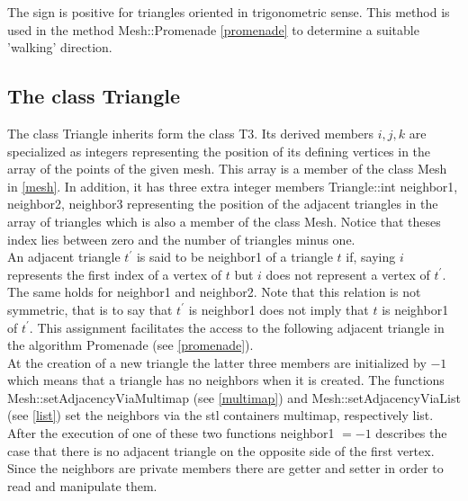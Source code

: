 \documentclass[10pt]{article}
\begin{document}
The sign is positive for triangles oriented in trigonometric sense. This method is used in the method {\ttfamily Mesh::Promenade} \ref{promenade} to determine a suitable 'walking' direction.


\subsection{The class Triangle} \label{triangle}
The class {\ttfamily Triangle} inherits form the class {\ttfamily T3}. Its derived members $ i,j,k $ are specialized as integers representing the position of its defining vertices in the array of the points of the given mesh. This array is a member of the class {\ttfamily Mesh} in \ref{mesh}. In addition, it has three extra integer members {\ttfamily Triangle::int neighbor1, neighbor2, neighbor3} representing the position of the adjacent triangles in the array of triangles which is also a member of the class {\ttfamily Mesh}. Notice that theses index lies between zero and the number of triangles minus one. \\
 An adjacent triangle $ t^{'} $ is said to be  {\ttfamily neighbor1} of a triangle $ t $ if, saying $ i $ represents the first index of a vertex of $t$ but $i$ does not represent a vertex of $ t^{'} $. The same holds for {\ttfamily neighbor1} and {\ttfamily neighbor2}. Note that this relation is not symmetric, that is to say that $ t^{'} $ is {\ttfamily neighbor1} does not imply that $t$ is {\ttfamily neighbor1} of $t^{'}$. 
This assignment facilitates the access to the following adjacent triangle in the algorithm {\ttfamily Promenade} (see \ref{promenade}).  \\
At the creation of a new triangle the latter three members are initialized by $ -1 $ which means that a triangle has no neighbors when it is created. The functions {\ttfamily Mesh::setAdjacencyViaMultimap} (see \ref{multimap}) and {\ttfamily Mesh::setAdjacencyViaList} (see \ref{list}) set the neighbors via the stl containers multimap, respectively list. After the execution of one of these two functions {\ttfamily neighbor1 $ = -1$} describes the case that there is no adjacent triangle on the opposite side of the first vertex. 
Since the neighbors are private members there are getter and setter in order to read and manipulate them.
\end{document}
